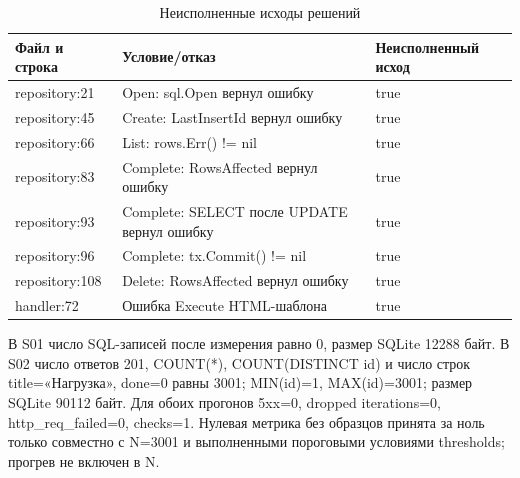 \documentclass[12pt,a4paper]{extarticle}
\begin{document}
\begin{longtable}{|P{30mm}|P{84mm}|P{38mm}|}
\caption{Неисполненные исходы решений}\\\hline
Файл и строка & Условие/отказ & Неисполненный исход \\\hline
repository:21 & Open: sql.Open вернул ошибку & true \\\hline
repository:45 & Create: LastInsertId вернул ошибку & true \\\hline
repository:66 & List: rows.Err() != nil & true \\\hline
repository:83 & Complete: RowsAffected вернул ошибку & true \\\hline
repository:93 & Complete: SELECT после UPDATE вернул ошибку & true \\\hline
repository:96 & Complete: tx.Commit() != nil & true \\\hline
repository:108 & Delete: RowsAffected вернул ошибку & true \\\hline
handler:72 & Ошибка Execute HTML-шаблона & true \\\hline
\end{longtable}

В S01 число SQL-записей после измерения равно 0, размер SQLite 12288 байт.
В S02 число ответов 201, COUNT(*), COUNT(DISTINCT id) и число
строк title=«Нагрузка», done=0 равны 3001; MIN(id)=1, MAX(id)=3001;
размер SQLite 90112 байт. Для обоих прогонов 5xx=0,
dropped iterations=0, http\_req\_failed=0, checks=1.
Нулевая метрика без образцов принята за ноль только совместно с N=3001
и выполненными пороговыми условиями thresholds; прогрев не включен в N.
\end{document}
